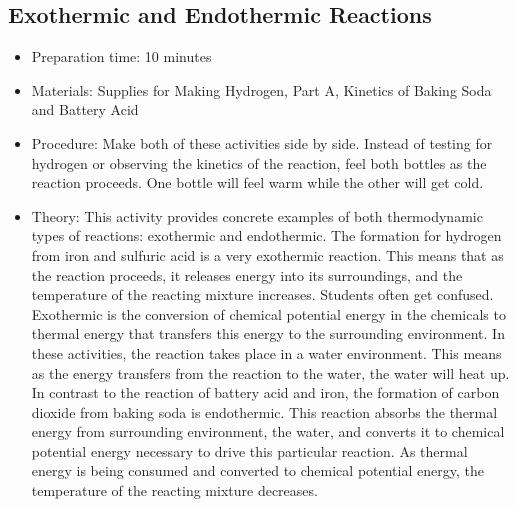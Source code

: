 \subsection{Exothermic and Endothermic Reactions}
\begin{itemize}
\item{Preparation time: 10 minutes}
\item{Materials: Supplies for Making Hydrogen, Part A, Kinetics of Baking Soda and Battery Acid}
\item{Procedure: Make both of these activities side by side. Instead of testing for hydrogen or observing the kinetics of the reaction, feel both bottles as the reaction proceeds. One bottle will feel warm while the other will get cold. }
\item{Theory: This activity provides concrete examples of both thermodynamic types of reactions: exothermic and endothermic. The formation for hydrogen from iron and sulfuric acid is a very exothermic reaction. This means that as the reaction proceeds, it releases energy into its surroundings, and the temperature of the reacting mixture increases. Students often get confused. Exothermic is the conversion of chemical potential energy in the chemicals to thermal energy that transfers this energy to the surrounding environment. In these activities, the reaction takes place in a water environment. This means as the energy transfers from the reaction to the water, the water will heat up. In contrast to the reaction of battery acid and iron, the formation of carbon dioxide from baking soda is endothermic. This reaction absorbs the thermal energy from surrounding environment, the water, and converts it to chemical potential energy necessary to drive this particular reaction. As thermal energy is being consumed and converted to chemical potential energy, the temperature of the reacting mixture decreases.}
\end{itemize}

